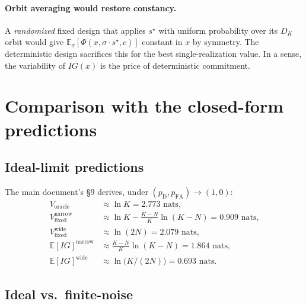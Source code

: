 \documentclass[11pt,a4paper]{article}
\newcommand{\E}{\mathbb{E}}
\begin{document}
\paragraph{Orbit averaging would restore constancy.}  A \emph{randomized} fixed design that applies $s^\star$ with uniform probability over its $D_K$ orbit would give $\E_{\sigma}[\Phi(x, \sigma \cdot s^\star, c)]$ constant in $x$ by symmetry.  The deterministic design sacrifices this for the best single-realization value.  In a sense, the variability of $IG(x)$ is the price of deterministic commitment.

\section{Comparison with the closed-form predictions}

\subsection{Ideal-limit predictions}
The main document's \S9 derives, under $(p_{\mathrm{D}}, p_{\mathrm{FA}}) \to (1, 0)$:
\begin{align}
  V_{\text{oracle}} &\approx \ln K = 2.773 \text{ nats,} \\
  V_{\text{fixed}}^{\text{narrow}} &\approx \ln K - \frac{K-N}{K}\ln(K-N) = 0.909 \text{ nats,} \\
  V_{\text{fixed}}^{\text{wide}}   &\approx \ln(2N) = 2.079 \text{ nats,} \\
  \E[IG]^{\text{narrow}} &\approx \frac{K-N}{K}\ln(K-N) = 1.864 \text{ nats,} \\
  \E[IG]^{\text{wide}}   &\approx \ln\!\bigl(K/(2N)\bigr) = 0.693 \text{ nats.}
\end{align}

\subsection{Ideal vs.\ finite-noise}
\end{document}
